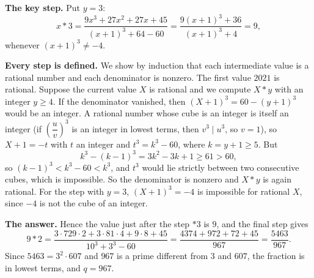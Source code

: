 \textbf{The key step.} Put $y=3$:
\[x*3=\dfrac{9x^3+27x^2+27x+45}{(x+1)^3+64-60}=\dfrac{9(x+1)^3+36}{(x+1)^3+4}=9,\]
whenever $(x+1)^3\ne-4$.

\textbf{Every step is defined.} We show by induction that each intermediate value is a rational number and each denominator is nonzero. The first value $2021$ is rational. Suppose the current value $X$ is rational and we compute $X*y$ with an integer $y\ge4$. If the denominator vanished, then $(X+1)^3=60-(y+1)^3$ would be an integer. A rational number whose cube is an integer is itself an integer (if $\left(\dfrac uv\right)^3$ is an integer in lowest terms, then $v^3\mid u^3$, so $v=1$), so $X+1=-t$ with $t$ an integer and $t^3=k^3-60$, where $k=y+1\ge5$. But
\[k^3-(k-1)^3=3k^2-3k+1\ge61>60,\]
so $(k-1)^3<k^3-60<k^3$, and $t^3$ would lie strictly between two consecutive cubes, which is impossible. So the denominator is nonzero and $X*y$ is again rational. For the step with $y=3$, $(X+1)^3=-4$ is impossible for rational $X$, since $-4$ is not the cube of an integer.

\textbf{The answer.} Hence the value just after the step $*3$ is $9$, and the final step gives
\[9*2=\dfrac{3\cdot729\cdot2+3\cdot81\cdot4+9\cdot8+45}{10^3+3^3-60}=\dfrac{4374+972+72+45}{967}=\dfrac{5463}{967}.\]
Since $5463=3^2\cdot607$ and $967$ is a prime different from $3$ and $607$, the fraction is in lowest terms, and $q=\boxed{967}$.
